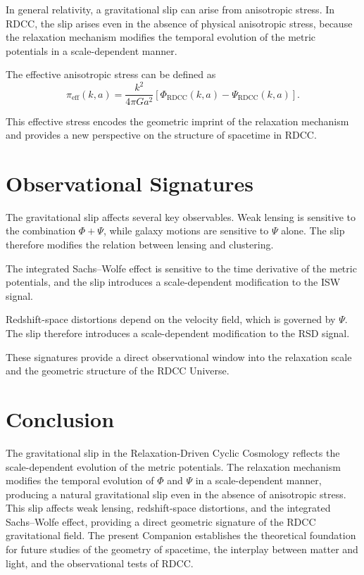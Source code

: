 \documentclass[11pt,a4paper]{article}
\begin{document}
In general relativity, a gravitational slip can arise from anisotropic stress. In 
RDCC, the slip arises even in the absence of physical anisotropic stress, because 
the relaxation mechanism modifies the temporal evolution of the metric potentials 
in a scale-dependent manner.

The effective anisotropic stress can be defined as
\begin{equation}
    \pi_{\mathrm{eff}}(k,a)
    = \frac{k^{2}}{4\pi G a^{2}}
      \left[
        \Phi_{\mathrm{RDCC}}(k,a)
        - \Psi_{\mathrm{RDCC}}(k,a)
      \right].
\end{equation}

This effective stress encodes the geometric imprint of the relaxation mechanism and 
provides a new perspective on the structure of spacetime in RDCC.
\section{Observational Signatures}

The gravitational slip affects several key observables. Weak lensing is sensitive 
to the combination $\Phi + \Psi$, while galaxy motions are sensitive to $\Psi$ 
alone. The slip therefore modifies the relation between lensing and clustering.

The integrated Sachs--Wolfe effect is sensitive to the time derivative of the 
metric potentials, and the slip introduces a scale-dependent modification to the 
ISW signal.

Redshift-space distortions depend on the velocity field, which is governed by 
$\Psi$. The slip therefore introduces a scale-dependent modification to the RSD 
signal.

These signatures provide a direct observational window into the relaxation scale 
and the geometric structure of the RDCC Universe.
\section{Conclusion}

The gravitational slip in the Relaxation-Driven Cyclic Cosmology reflects the 
scale-dependent evolution of the metric potentials. The relaxation mechanism 
modifies the temporal evolution of $\Phi$ and $\Psi$ in a scale-dependent manner, 
producing a natural gravitational slip even in the absence of anisotropic stress. 
This slip affects weak lensing, redshift-space distortions, and the integrated 
Sachs--Wolfe effect, providing a direct geometric signature of the RDCC 
gravitational field. The present Companion establishes the theoretical foundation 
for future studies of the geometry of spacetime, the interplay between matter and 
light, and the observational tests of RDCC.
\end{document}

